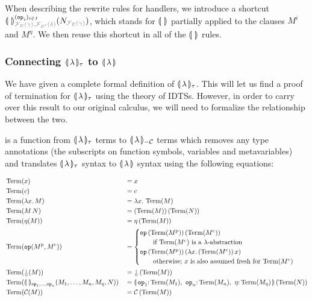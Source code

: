 When describing the rewrite rules for handlers, we introduce a shortcut
$\banana{}^{(\op{op}_i)_{i \in
    I}}_{\typehint{\FF_E(\gamma),\FF_{E'}(\delta)}}(N_{\typehint{\FF_E(\gamma)}})$,
which stands for $\llparenthesis \,  \, \rrparenthesis$ partially applied to the clauses $M^i$ and
$M^\eta$. We then reuse this shortcut in all of the $\llparenthesis \,  \, \rrparenthesis$ rules.


\subsubsection{Connecting $\llparenthesis \, \lambda \, \rrparenthesis_\tau$ to ${\llparenthesis \, \lambda \, \rrparenthesis}$}
\label{sssec:connecting-bananas}

We have given a complete formal definition of $\llparenthesis \, \lambda \, \rrparenthesis_\tau$. This
will let us find a proof of termination for $\llparenthesis \, \lambda \, \rrparenthesis_\tau$ using
the theory of IDTSs. However, in order to carry over this result to our
original calculus, we will need to formalize the relationship between the
two.

\begin{definition}
   is a function from $\llparenthesis \, \lambda \, \rrparenthesis_\tau$ terms to
  ${\llparenthesis \, \lambda \, \rrparenthesis_{-\mathcal{C}}}$ terms which removes any type annotations (the subscripts on
  function symbols, variables and metavariables) and translates
  $\llparenthesis \, \lambda \, \rrparenthesis_\tau$ syntax to $\llparenthesis \, \lambda \, \rrparenthesis$ syntax using the
  following equations:
  
  \begin{align*}
    & \Term(x) &&= x \\
    & \Term(c) &&= c \\
    & \Term(\lam{x}{M}) &&= \lam{x}{\Term(M)} \\
    & \Term(\ap{M}{N}) &&= \ap{(\Term(M))}{(\Term(N))} \\
    & \Term(\eta(M)) &&= \etaE{(\Term(M))} \\
    & \Term(\op{op}(M^{\mathrm{p}}, M^{\mathrm{c}})) &&=
        \begin{cases}
          \app{\op{op}}{(\Term(M^{\mathrm{p}}))}{(\Term(M^{\mathrm{c}}))}
            \\ \text{\qquad if $\Term(M^{\mathrm{c}})$ is a $\lambda$-abstraction} \\
          \app{\op{op}}{(\Term(M^{\mathrm{p}}))}{(\lam{x}{\ap{(\Term(M^{\mathrm{c}}))}{x}})}
            \\ \text{\qquad otherwise; $x$ is also assumed fresh for $\Term(M^{\mathrm{c}})$} 
        \end{cases} \\
    & \Term(\cherry(M)) &&= \ap{\cherry}{(\Term(M))} \\
    & \Term(\banana{}_{\op{op}_1, \ldots, \op{op}_n}(M_1, \ldots, M_n, M_\eta, N)) &&= \ap{\banana{\onto{\op{op}_1}{\Term(M_1)},\ \onto{\op{op}_n}{\Term(M_n)},\ \onto{\eta}{\Term(M_\eta)}}}{(\Term(N))} \\
    & \Term(\CC(M)) &&= \ap{\CC}{(\Term(M))}
  \end{align*}
\end{definition}

